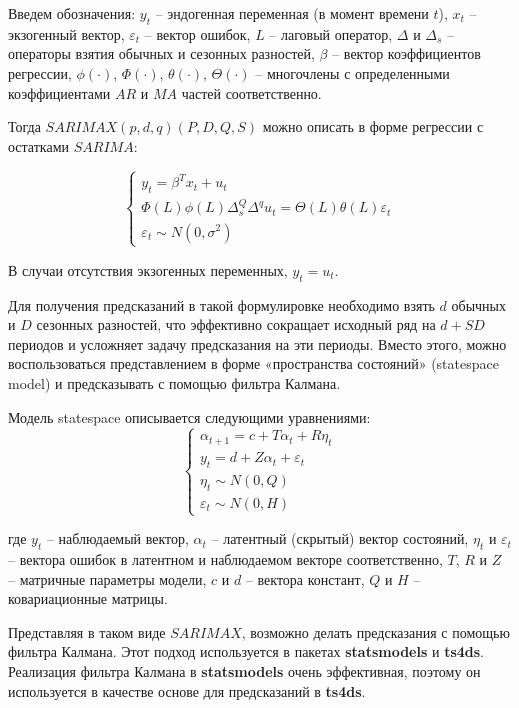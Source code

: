 \documentclass[../report.tex]{subfiles}
\begin{document}
	Введем обозначения:
	$y_t$ – эндогенная переменная (в момент времени $t$), 
	$x_t$ – экзогенный вектор, 
	$\varepsilon_t$ – вектор ошибок, 
	$L$ – лаговый оператор, 
	$\Delta$ и $\Delta_s$ – операторы взятия обычных и сезонных разностей, 
	$\beta$ – вектор коэффициентов регрессии, 
	$\phi(\cdot)$, $\Phi(\cdot)$, $\theta(\cdot)$, $\Theta(\cdot)$ – многочлены с определенными коэффициентами $AR$ и $MA$ частей соответственно.
	
	Тогда $SARIMAX(p,d,q)(P,D,Q,S)$ можно описать в форме регрессии с остатками $SARIMA$:
	
	\begin{equation}
		\begin{cases}
			y_t = \beta^{T} x_t + u_t \\
			\Phi(L) \phi(L) \Delta_s^{Q} \Delta^{q} u_t = \Theta(L) \theta(L) \varepsilon_t \\
			\varepsilon_t \sim N(0,\sigma^{2})
		\end{cases}
	\end{equation}
	
	В случаи отсутствия экзогенных переменных, $y_t = u_t$.
	
	Для получения предсказаний в такой формулировке необходимо взять $d$ обычных и $D$ сезонных разностей, что эффективно сокращает исходный ряд на $d+SD$ периодов и усложняет задачу предсказания на эти периоды. Вместо этого, можно воспользоваться представлением в форме «пространства состояний» (statespace model) и предсказывать с помощью фильтра Калмана.
	
	Модель statespace описывается следующими уравнениями:
	\begin{equation}
		\begin{cases}
			\alpha_{t+1} = c + T \alpha_t + R \eta_t \\
			y_t = d + Z \alpha_t + \varepsilon_t \\
			\eta_{t} \sim N(0, Q) \\
			\varepsilon_t \sim N(0, H)
		\end{cases} 
	\end{equation}
	
	где $y_t$ – наблюдаемый вектор, $\alpha_t$ – латентный (скрытый) вектор состояний, $\eta_t$ и $\varepsilon_t$ – вектора ошибок в латентном и наблюдаемом векторе соответственно,
	$T$, $R$ и $Z$ – матричные параметры модели, $c$ и $d$ – вектора констант, $Q$ и $H$ – ковариационные матрицы.
	
	Представляя в таком виде $SARIMAX$, возможно делать предсказания с помощью фильтра Калмана. Этот подход используется в пакетах \textbf{statsmodels}\cite{fulton_statespace} и \textbf{ts4ds}. Реализация фильтра Калмана в \textbf{statsmodels} очень эффективная, поэтому он используется в качестве основе для предсказаний в \textbf{ts4ds}. 
	
\end{document}
